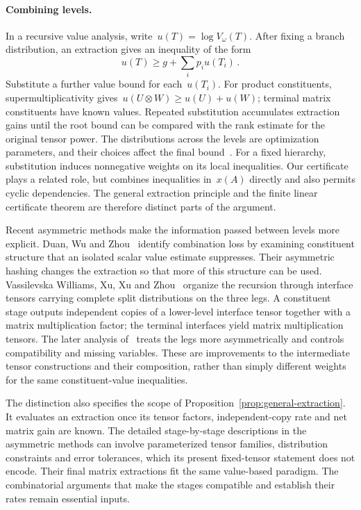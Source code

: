 \documentclass[11pt,letterpaper]{article}
\theoremstyle{definition}
\numberwithin{equation}{section}
\begin{document}
\paragraph{Combining levels.}
In a recursive value analysis, write~$u(T)=\log V_\omega(T)$. After fixing a branch distribution, an extraction gives an inequality of the form
\begin{equation*}
 u(T)\geq g+\sum_i p_i u(T_i)\,.
\end{equation*}
Substitute a further value bound for each~$u(T_i)$. For product constituents, supermultiplicativity gives~$u(U\otimes W)\geq u(U)+u(W)$; terminal matrix constituents have known values. Repeated substitution accumulates extraction gains until the root bound can be compared with the rank estimate for the original tensor power. The distributions across the levels are optimization parameters, and their choices affect the final bound~\cite[Sections 5--6]{AW21}. For a fixed hierarchy, substitution induces nonnegative weights on its local inequalities. Our certificate plays a related role, but combines inequalities in~$x(A)$ directly and also permits cyclic dependencies. The general extraction principle and the finite linear certificate theorem are therefore distinct parts of the argument.

Recent asymmetric methods make the information passed between levels more explicit. Duan, Wu and Zhou~\cite[Section 2]{DWZ23} identify combination loss by examining constituent structure that an isolated scalar value estimate suppresses. Their asymmetric hashing changes the extraction so that more of this structure can be used. Vassilevska Williams, Xu, Xu and Zhou~\cite[Section 4.1]{VXXZ24} organize the recursion through interface tensors carrying complete split distributions on the three legs. A constituent stage outputs independent copies of a lower-level interface tensor together with a matrix multiplication factor; the terminal interfaces yield matrix multiplication tensors. The later analysis of~\cite{AD25} treats the legs more asymmetrically and controls compatibility and missing variables. These are improvements to the intermediate tensor constructions and their composition, rather than simply different weights for the same constituent-value inequalities.

The distinction also specifies the scope of Proposition~\ref{prop:general-extraction}. It evaluates an extraction once its tensor factors, independent-copy rate and net matrix gain are known. The detailed stage-by-stage descriptions in the asymmetric methods can involve parameterized tensor families, distribution constraints and error tolerances, which its present fixed-tensor statement does not encode. Their final matrix extractions fit the same value-based paradigm. The combinatorial arguments that make the stages compatible and establish their rates remain essential inputs.
\end{document}
